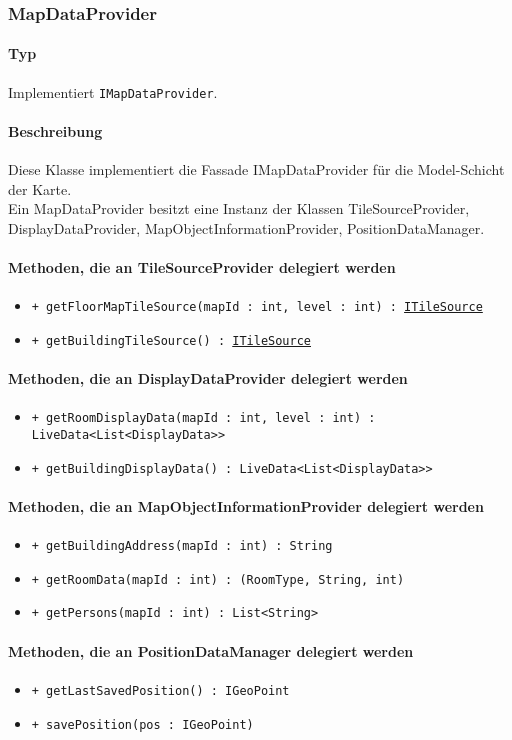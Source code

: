 \subsubsection{MapDataProvider}
\paragraph*{Typ}
Implementiert \texttt{IMapDataProvider}.
\paragraph*{Beschreibung}
Diese Klasse implementiert die Fassade IMapDataProvider für die Model-Schicht der Karte.\\
Ein MapDataProvider besitzt eine Instanz der Klassen 
TileSourceProvider, DisplayDataProvider, MapObjectInformationProvider, PositionDataManager.

\paragraph*{Methoden, die an TileSourceProvider delegiert werden}
\begin{itemize}
    \item \texttt{+ getFloorMapTileSource(mapId : int, level : int) : \href{https://osmdroid.github.io/osmdroid/javadocAll/org/osmdroid/tileprovider/tilesource/ITileSource.html}{ITileSource}}
    \item \texttt{+ getBuildingTileSource() : \href{https://osmdroid.github.io/osmdroid/javadocAll/org/osmdroid/tileprovider/tilesource/ITileSource.html}{ITileSource}}
\end{itemize}

\paragraph*{Methoden, die an DisplayDataProvider delegiert werden}
\begin{itemize}
    \item \texttt{+ getRoomDisplayData(mapId : int, level : int) : LiveData<List<DisplayData>>}
    \item \texttt{+ getBuildingDisplayData() : LiveData<List<DisplayData>>}
\end{itemize}

\paragraph*{Methoden, die an MapObjectInformationProvider delegiert werden}
\begin{itemize}
    \item \texttt{+ getBuildingAddress(mapId : int) : String}
    \item \texttt{+ getRoomData(mapId : int) : (RoomType, String, int)}
    \item \texttt{+ getPersons(mapId : int) : List<String>}
\end{itemize}

\paragraph*{Methoden, die an PositionDataManager delegiert werden}
\begin{itemize}
    \item \texttt{+ getLastSavedPosition() : IGeoPoint}
    \item \texttt{+ savePosition(pos : IGeoPoint)}
\end{itemize}

